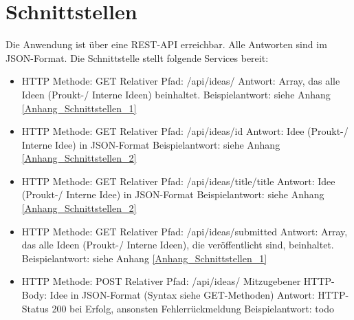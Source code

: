\usepackage{cleveref}



\section{Schnittstellen}

Die Anwendung ist über eine REST-API erreichbar. Alle Antworten sind im JSON-Format. Die Schnittstelle stellt folgende Services bereit:
\begin{itemize}
    \item HTTP Methode: GET
    \subitem Relativer Pfad: /api/ideas/
    \subitem Antwort: Array, das alle Ideen (Proukt-/ Interne Ideen) beinhaltet.
    \subitem Beispielantwort: siehe Anhang \cref{Anhang_Schnittstellen_1}
\end{itemize}

\begin{itemize}
    \item HTTP Methode: GET
    \subitem Relativer Pfad: /api/ideas/{id}
    \subitem Antwort: Idee (Proukt-/ Interne Idee) in JSON-Format
    \subitem Beispielantwort: siehe Anhang \cref{Anhang_Schnittstellen_2}
\end{itemize}

\begin{itemize}
    \item HTTP Methode: GET
    \subitem Relativer Pfad: /api/ideas/title/{title}
    \subitem Antwort: Idee (Proukt-/ Interne Idee) in JSON-Format
    \subitem Beispielantwort: siehe Anhang \cref{Anhang_Schnittstellen_2}
\end{itemize}

\begin{itemize}
    \item HTTP Methode: GET
    \subitem Relativer Pfad: /api/ideas/submitted
    \subitem Antwort: Array, das alle Ideen (Proukt-/ Interne Ideen), die veröffentlicht sind, beinhaltet.
    \subitem Beispielantwort: siehe Anhang \cref{Anhang_Schnittstellen_1}
\end{itemize}

\begin{itemize}
    \item HTTP Methode: POST
    \subitem Relativer Pfad: /api/ideas/
    \subitem Mitzugebener HTTP-Body: Idee in JSON-Format (Syntax siehe GET-Methoden)
    \subitem Antwort: HTTP-Status 200 bei Erfolg, ansonsten Fehlerrückmeldung
    \subitem Beispielantwort: todo
\end{itemize}


